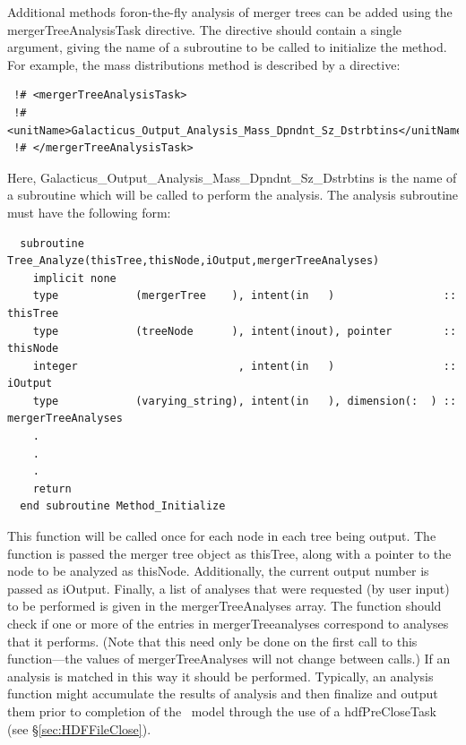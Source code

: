 Additional methods foron-the-fly analysis of merger trees can be added using the {\normalfont \ttfamily mergerTreeAnalysisTask} directive. The directive should contain a single argument, giving the name of a subroutine to be called to initialize the method. For example, the mass distributions method is described by a directive:
\begin{verbatim}
 !# <mergerTreeAnalysisTask>
 !#  <unitName>Galacticus_Output_Analysis_Mass_Dpndnt_Sz_Dstrbtins</unitName>
 !# </mergerTreeAnalysisTask>
\end{verbatim}
Here, {\normalfont \ttfamily Galacticus\_Output\_Analysis\_Mass\_Dpndnt\_Sz\_Dstrbtins} is the name of a subroutine which will be called to perform the analysis. The analysis subroutine must have the following form:
\begin{verbatim}
  subroutine Tree_Analyze(thisTree,thisNode,iOutput,mergerTreeAnalyses)
    implicit none
    type            (mergerTree    ), intent(in   )                 :: thisTree
    type            (treeNode      ), intent(inout), pointer        :: thisNode
    integer                         , intent(in   )                 :: iOutput
    type            (varying_string), intent(in   ), dimension(:  ) :: mergerTreeAnalyses
    .
    .
    .
    return
  end subroutine Method_Initialize
\end{verbatim}
This function will be called once for each node in each tree being output. The function is passed the merger tree object as {\normalfont \ttfamily thisTree}, along with a pointer to the node to be analyzed as {\normalfont \ttfamily thisNode}. Additionally, the current output number is passed as {\normalfont \ttfamily iOutput}. Finally, a list of analyses that were requested (by user input) to be performed is given in the {\normalfont \ttfamily mergerTreeAnalyses} array. The function should check if one or more of the entries in {\normalfont \ttfamily mergerTreeanalyses} correspond to analyses that it performs. (Note that this need only be done on the first call to this function---the values of {\normalfont \ttfamily mergerTreeAnalyses} will not change between calls.) If an analysis is matched in this way it should be performed. Typically, an analysis function might accumulate the results of analysis and then finalize and output them prior to completion of the \glc\ model through the use of a {\normalfont \ttfamily hdfPreCloseTask} (see \S\ref{sec:HDFFileClose}).

